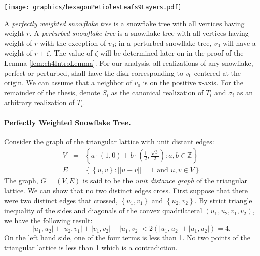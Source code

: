 \documentclass[10pt]{CSUNthesis}
\theoremstyle{plain}%
\theoremstyle{definition}
\theoremstyle{remark}
\newcommand{\bbZ}{{\mathbb{Z}}}
\newcommand{\lr}[1]{\left( #1 \right)}
\newcommand{\vlr}[1]{\left\vert #1 \right\vert}
\begin{document}
\begin{minipage}{\linewidth}
\begin{center}
\texttt{[image: graphics/hexagonPetiolesLeafs9Layers.pdf]}
\label{fig:hexagonPetiolesLeafs9Layers.pdf}
\end{center}
\end{minipage}

A \textit{perfectly weighted snowflake tree} is a snowflake tree with all vertices having weight $r$.   
A \textit{perturbed snowflake tree} is a snowflake tree with all vertices having weight of $r$ with the exception of $v_0$;  in a perturbed snowflake tree, $v_0$ will have a weight of $r + \zeta$.  
The value of $\zeta $ will be determined later on in the proof of the Lemma \ref{lem:ch4IntroLemma}.  
For our analysis, all realizations of any snowflake, perfect or perturbed, shall have the disk corresponding to $v_0$ centered at the origin.  
We can assume that a neighbor of $v_0$ is on the positive x-axis.     
For the remainder of the thesis, denote $S_i$ as the canonical realization of $T_i$ and $\sigma_i$ as an arbitrary realization of $T_i$. 

\paragraph{Perfectly Weighted Snowflake Tree.}

Consider the graph of the triangular lattice with unit distant edges:
\begin{eqnarray*}
V &=& \left\lbrace a \cdot (1,0) + b \cdot \left(\frac{1}{2},\frac{\sqrt{3}}{2}\right) : a,b \in \bbZ \right\rbrace\\
E &=& \left\lbrace \left\lbrace u,v \right\rbrace : \vert\vert u-v \vert\vert = 1 \text{ and } u,v \in V\right\rbrace
\end{eqnarray*}
The graph, $G=(V,E)$ is said to be the \textit{unit distance graph} of the triangular lattice.  
We can show that no two distinct edges cross.  
First suppose that there were two distinct edges that crossed, $\left\lbrace u_1,v_1 \right\rbrace $ and $\left\lbrace u_2,v_2 \right\rbrace$. 
By strict triangle inequality of the sides and diagonals of the convex quadrilateral $\lr{u_1, u_2, v_1, v_2}$, we have the following result:
$$\vlr{u_1,u_2} + \vlr{u_2,v_1} + \vlr{v_1,v_2} + \vlr{u_1,v_2} < 2 \lr{\vlr{u_1,u_2} + \vlr{u_1,u_2 }}=4.$$ 
On the left hand side, one of the four terms is less than 1.  
No two points of the triangular lattice is less than 1 which is a contradiction.
\end{document}
